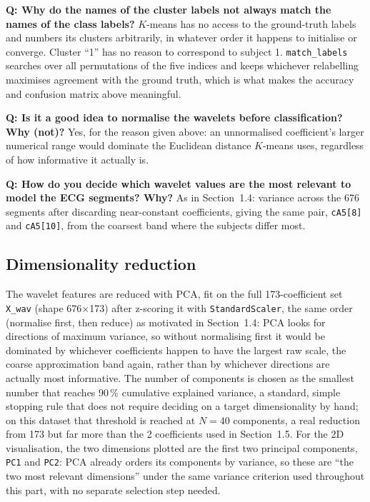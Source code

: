 \documentclass[11pt,a4paper]{article}
\newcommand{\percent}{\%}
\newcommand{\num}[1]{#1}
\newcommand{\SI}[2]{#1\,#2}
\begin{document}
\textbf{Q: Why do the names of the cluster labels not always match the names of the class
labels?} $K$-means has no access to the ground-truth labels and numbers its clusters
arbitrarily, in whatever order it happens to initialise or converge. Cluster ``1'' has no reason
to correspond to subject 1. \texttt{match\_labels} searches over all permutations of the five
indices and keeps whichever relabelling maximises agreement with the ground truth, which is
what makes the accuracy and confusion matrix above meaningful.

\textbf{Q: Is it a good idea to normalise the wavelets before classification? Why (not)?} Yes,
for the reason given above: an unnormalised coefficient's larger numerical range would dominate
the Euclidean distance $K$-means uses, regardless of how informative it actually is.

\textbf{Q: How do you decide which wavelet values are the most relevant to model the ECG
segments? Why?} As in Section~1.4: variance across the \num{676} segments after discarding
near-constant coefficients, giving the same pair, \texttt{cA5[8]} and \texttt{cA5[10]}, from the
coarsest band where the subjects differ most.

\subsection{Dimensionality reduction}

The wavelet features are reduced with PCA, fit on the full \num{173}-coefficient set
\texttt{X\_wav} (shape \num{676}$\times$\num{173}) after z-scoring it with
\texttt{StandardScaler}, the same order (normalise first, then reduce) as motivated in
Section~1.4: PCA looks for directions of maximum variance, so without normalising first it
would be dominated by whichever coefficients happen to have the largest raw scale, the coarse
approximation band again, rather than by whichever directions are actually most informative.
The number of components is chosen as the smallest number that reaches \SI{90}{\percent}
cumulative explained variance, a standard, simple stopping rule that does not require deciding
on a target dimensionality by hand; on this dataset that threshold is reached at $N=\num{40}$
components, a real reduction from \num{173} but far more than the \num{2} coefficients used in
Section~1.5. For the 2D visualisation, the two dimensions plotted are the first two principal
components, \texttt{PC1} and \texttt{PC2}: PCA already orders its components by variance, so
these are ``the two most relevant dimensions'' under the same variance criterion used throughout
this part, with no separate selection step needed.
\end{document}
